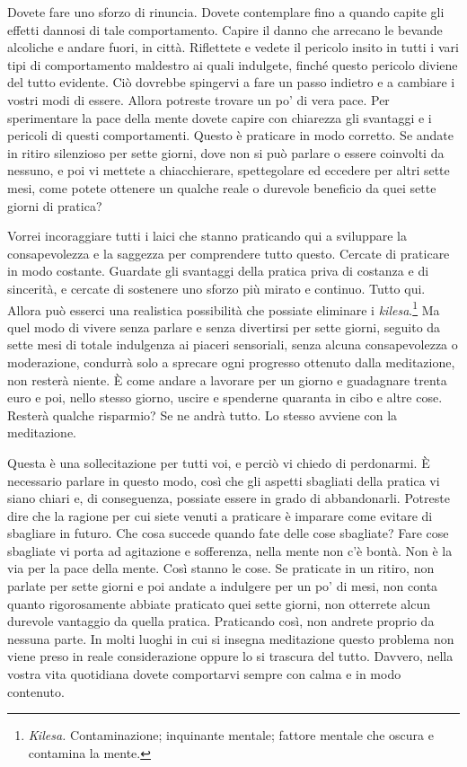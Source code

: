 Dovete fare uno sforzo di rinuncia. Dovete contemplare fino a quando
capite gli effetti dannosi di tale comportamento. Capire il danno che
arrecano le bevande alcoliche e andare fuori, in città. Riflettete e
vedete il pericolo insito in tutti i vari tipi di comportamento
maldestro ai quali indulgete, finché questo pericolo diviene del tutto
evidente. Ciò dovrebbe spingervi a fare un passo indietro e a cambiare i
vostri modi di essere. Allora potreste trovare un po' di vera pace. Per
sperimentare la pace della mente dovete capire con chiarezza gli
svantaggi e i pericoli di questi comportamenti. Questo è praticare in
modo corretto. Se andate in ritiro silenzioso per sette giorni, dove non
si può parlare o essere coinvolti da nessuno, e poi vi mettete a
chiacchierare, spettegolare ed eccedere per altri sette mesi, come
potete ottenere un qualche reale o durevole beneficio da quei sette
giorni di pratica?

Vorrei incoraggiare tutti i laici che stanno praticando qui a sviluppare
la consapevolezza e la saggezza per comprendere tutto questo. Cercate di
praticare in modo costante. Guardate gli svantaggi della pratica priva
di costanza e di sincerità, e cercate di sostenere uno sforzo più mirato
e continuo. Tutto qui. Allora può esserci una realistica possibilità che
possiate eliminare i \emph{kilesa}.\footnote{\emph{Kilesa.}
  Contaminazione; inquinante mentale; fattore mentale che oscura e
  contamina la mente.} Ma quel modo di vivere senza parlare e senza
divertirsi per sette giorni, seguito da sette mesi di totale indulgenza
ai piaceri sensoriali, senza alcuna consapevolezza o moderazione,
condurrà solo a sprecare ogni progresso ottenuto dalla meditazione, non
resterà niente. È come andare a lavorare per un giorno e guadagnare
trenta euro e poi, nello stesso giorno, uscire e spenderne quaranta in
cibo e altre cose. Resterà qualche risparmio? Se ne andrà tutto. Lo
stesso avviene con la meditazione.

Questa è una sollecitazione per tutti voi, e perciò vi chiedo di
perdonarmi. È necessario parlare in questo modo, così che gli aspetti
sbagliati della pratica vi siano chiari e, di conseguenza, possiate
essere in grado di abbandonarli. Potreste dire che la ragione per cui
siete venuti a praticare è imparare come evitare di sbagliare in futuro.
Che cosa succede quando fate delle cose sbagliate? Fare cose sbagliate
vi porta ad agitazione e sofferenza, nella mente non c'è bontà. Non è la
via per la pace della mente. Così stanno le cose. Se praticate in un
ritiro, non parlate per sette giorni e poi andate a indulgere per un po'
di mesi, non conta quanto rigorosamente abbiate praticato quei sette
giorni, non otterrete alcun durevole vantaggio da quella pratica.
Praticando così, non andrete proprio da nessuna parte. In molti luoghi
in cui si insegna meditazione questo problema non viene preso in reale
considerazione oppure lo si trascura del tutto. Davvero, nella vostra
vita quotidiana dovete comportarvi sempre con calma e in modo contenuto.

